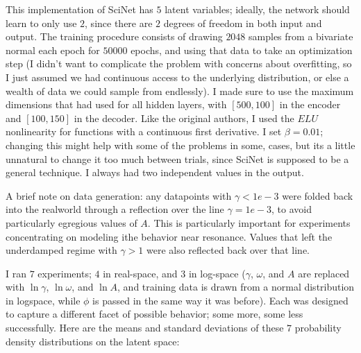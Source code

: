 \documentclass[aps,prl,preprint,groupedaddress]{revtex4-1}
\begin{document}
This implementation of SciNet has $5$ latent variables; ideally, the network should learn to only use $2$, since there are $2$ degrees of freedom in both input and output. The training procedure consists of drawing $2048$ samples from a bivariate normal each epoch for $50000$ epochs, and using that data to take an optimization step (I didn't want to complicate the problem with concerns about overfitting, so I just assumed we had continuous access to the underlying distribution, or else a wealth of data we could sample from endlessly). I made sure to use the maximum dimensions that \cite{iten2020} had used for all hidden layers, with $[500, 100]$ in the encoder and $[100, 150]$ in the decoder. Like the original authors, I used the $ELU$ nonlinearity for functions with a continuous first derivative. I set $\beta = 0.01$; changing this might help with some of the problems in some, cases, but its a little unnatural to change it too much between trials, since SciNet is supposed to be a general technique. I always had two independent values in the output. 

A brief note on data generation: any datapoints with $\gamma < 1e-3$ were folded back into the realworld through a reflection over the line $\gamma = 1e-3$, to avoid particularly egregious values of $A$. This is particularly important for experiments concentrating on modeling ithe behavior near resonance. Values that left the underdamped regime with $\gamma > 1$ were also reflected back over that line. 

I ran $7$ experiments; $4$ in real-space, and $3$ in log-space ($\gamma$, $\omega$, and $A$ are replaced with $\ln \gamma$, $\ln \omega$, and $\ln A$, and training data is drawn from a normal distribution in logspace, while $\phi$ is passed in the same way it was before). Each was designed to capture a different facet of possible behavior; some more, some less successfully. Here are the means and standard deviations of these $7$ probability density distributions on the latent space:
\end{document}
